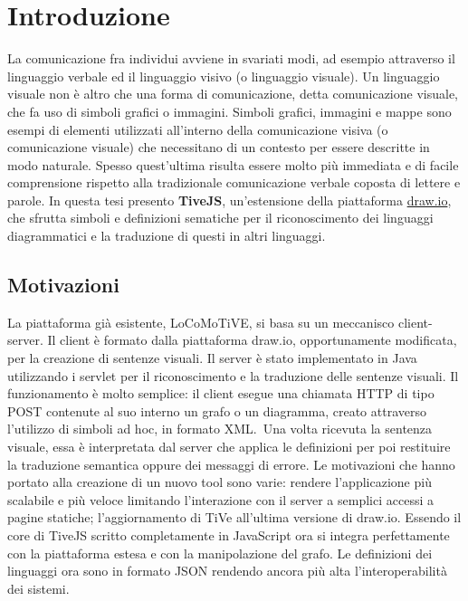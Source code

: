 ﻿\chapter{Introduzione}

    La comunicazione fra individui avviene in svariati modi, ad esempio attraverso il linguaggio verbale ed il linguaggio visivo (o linguaggio visuale).
    \newline
    Un linguaggio visuale non è altro che una forma di comunicazione, detta comunicazione visuale, che fa uso di simboli grafici o immagini. Simboli grafici, immagini e mappe sono esempi di elementi utilizzati all'interno della comunicazione visiva (o comunicazione visuale) che necessitano di un contesto per essere descritte in modo naturale. Spesso quest'ultima risulta essere molto più immediata e di facile comprensione rispetto alla tradizionale comunicazione verbale coposta di lettere e parole.
    \newline
    In questa tesi presento \textbf{TiveJS}, un'estensione della piattaforma \href{https://www.draw.io/}{draw.io}, che sfrutta  simboli e  definizioni sematiche per il riconoscimento dei linguaggi diagrammatici e la traduzione di questi in altri linguaggi.

    \section{Motivazioni}
        La piattaforma già esistente, LoCoMoTiVE, si basa su un meccanisco client-server.
        \newline
        Il client è formato dalla piattaforma draw.io, opportunamente modificata, per la creazione di sentenze visuali.
        Il server è stato implementato in Java utilizzando i servlet per il riconoscimento e la traduzione delle sentenze visuali.
        Il funzionamento è molto semplice: il client esegue una chiamata HTTP di tipo POST contenute al suo interno un grafo o un diagramma, creato attraverso l'utilizzo di simboli ad hoc, in formato XML.~Una volta ricevuta la sentenza visuale, essa è interpretata dal server che applica le definizioni per poi restituire la traduzione semantica oppure dei messaggi di errore.
        \newline
        Le motivazioni che hanno portato alla creazione di un nuovo tool sono varie: rendere l'applicazione più scalabile e più veloce limitando l'interazione con il server a semplici accessi a pagine statiche; l'aggiornamento di TiVe all'ultima versione di draw.io.
        Essendo il core di TiveJS scritto completamente in JavaScript ora si integra perfettamente con la piattaforma estesa e con la manipolazione del grafo.
        Le definizioni dei linguaggi ora sono in formato JSON rendendo ancora più alta l'interoperabilità dei sistemi. 

